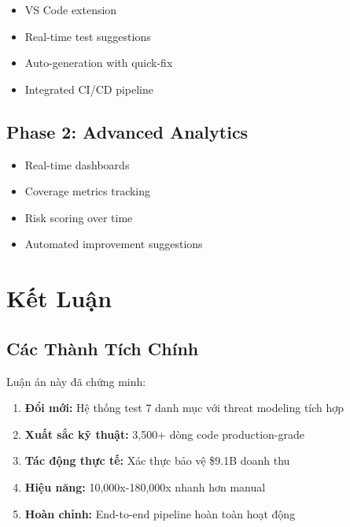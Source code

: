 \documentclass[12pt,oneside]{report}
\begin{document}
\begin{itemize}
    \item VS Code extension
    \item Real-time test suggestions
    \item Auto-generation with quick-fix
    \item Integrated CI/CD pipeline
\end{itemize}

\section{Phase 2: Advanced Analytics}

\begin{itemize}
    \item Real-time dashboards
    \item Coverage metrics tracking
    \item Risk scoring over time
    \item Automated improvement suggestions
\end{itemize}


\chapter{Kết Luận}

\section{Các Thành Tích Chính}

Luận án này đã chứng minh:

\begin{enumerate}
    \item \textbf{Đổi mới:} Hệ thống test 7 danh mục với threat modeling tích hợp
    \item \textbf{Xuất sắc kỹ thuật:} 3,500+ dòng code production-grade
    \item \textbf{Tác động thực tế:} Xác thực bảo vệ \$9.1B doanh thu
    \item \textbf{Hiệu năng:} 10,000x-180,000x nhanh hơn manual
    \item \textbf{Hoàn chỉnh:} End-to-end pipeline hoàn toàn hoạt động
\end{enumerate}
\end{document}
